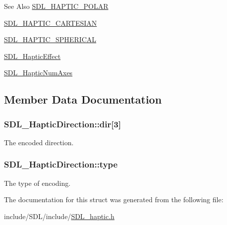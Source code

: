 \begin{DoxySeeAlso}{See Also}
\hyperlink{_s_d_l__haptic_8h_acdc35e97e5525472054a67b76e518f3b}{S\-D\-L\-\_\-\-H\-A\-P\-T\-I\-C\-\_\-\-P\-O\-L\-A\-R} 

\hyperlink{_s_d_l__haptic_8h_af8b2430a363a968de2a5b64c8f663d3b}{S\-D\-L\-\_\-\-H\-A\-P\-T\-I\-C\-\_\-\-C\-A\-R\-T\-E\-S\-I\-A\-N} 

\hyperlink{_s_d_l__haptic_8h_a1fcf7cb0eaf3c39b16ba266054e25aff}{S\-D\-L\-\_\-\-H\-A\-P\-T\-I\-C\-\_\-\-S\-P\-H\-E\-R\-I\-C\-A\-L} 

\hyperlink{union_s_d_l___haptic_effect}{S\-D\-L\-\_\-\-Haptic\-Effect} 

\hyperlink{_s_d_l__haptic_8h_ad6705645197f6df4eeeea32392462483}{S\-D\-L\-\_\-\-Haptic\-Num\-Axes} 
\end{DoxySeeAlso}


\subsection{Member Data Documentation}
\hypertarget{struct_s_d_l___haptic_direction_a6cebd8118a3e61e36bd0c503ae020362}{
\subsubsection[{dir}]{ S\-D\-L\-\_\-\-Haptic\-Direction\-::dir\mbox{[}3\mbox{]}}}\label{struct_s_d_l___haptic_direction_a6cebd8118a3e61e36bd0c503ae020362}
The encoded direction. \hypertarget{struct_s_d_l___haptic_direction_acd6830ad68c4ba2af16057fa418087cc}{
\subsubsection[{type}]{ S\-D\-L\-\_\-\-Haptic\-Direction\-::type}}\label{struct_s_d_l___haptic_direction_acd6830ad68c4ba2af16057fa418087cc}
The type of encoding. 

The documentation for this struct was generated from the following file\-:\begin{DoxyCompactItemize}
\item 
include/\-S\-D\-L/include/\hyperlink{_s_d_l__haptic_8h}{S\-D\-L\-\_\-haptic.\-h}\end{DoxyCompactItemize}

